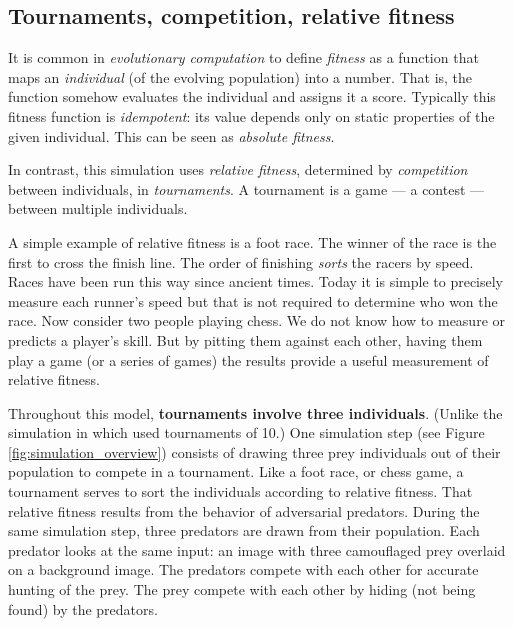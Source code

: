 \documentclass[acmtog]{acmart}
\newcommand{\jargon}[1]{\textit{#1}}
\begin{document}
\subsection{Tournaments, competition, relative fitness}
\label{subsec:tournaments}
It is common in \jargon{evolutionary computation} to define \jargon{fitness} as a function that maps an \jargon{individual} (of the evolving population) into a number. That is, the function somehow evaluates the individual and assigns it a score. Typically this fitness function is \jargon{idempotent}: its value depends only on static properties of the given individual. This can be seen as \jargon{absolute fitness}.
\par
In contrast, this simulation uses \jargon{relative fitness}, determined by \jargon{competition} between individuals, in \jargon{tournaments}. A tournament is a game — a contest — between multiple individuals. 
\par
A simple example of relative fitness is a foot race. The winner of the race is the first to cross the finish line. The order of finishing \jargon{sorts} the racers by speed. Races have been run this way since ancient times. Today it is simple to precisely measure each runner's speed but that is not required to determine who won the race. Now consider two people playing chess. We do not know how to measure or predicts a player's skill. But by pitting them against each other, having them play a game (or a series of games) the results provide a useful measurement of relative fitness. 
\par
Throughout this model, \textbf{tournaments involve three individuals}. (Unlike the simulation in \citet{reynolds_iec_2011} which used tournaments of 10.) One simulation step (see Figure \ref{fig:simulation_overview}) consists of drawing three prey individuals out of their population to compete in a tournament. Like a foot race, or chess game, a tournament serves to sort the individuals according to relative fitness. That relative fitness results from the behavior of adversarial predators. During the same simulation step, three predators are drawn from their population. Each predator looks at the same input: an image with three camouflaged prey overlaid on a background image. The predators compete with each other for accurate hunting of the prey. The prey compete with each other by hiding (not being found) by the predators.
\par

\end{document}
